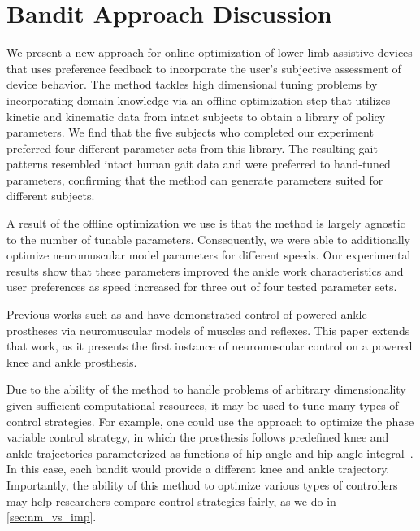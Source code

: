 \section{Bandit Approach Discussion}\label{sec:bandit_discussion}

We present a new approach for online optimization of lower limb assistive
devices that uses preference feedback to incorporate the user's subjective
assessment of device behavior. The method tackles high dimensional tuning
problems by incorporating domain knowledge via an offline optimization step that
utilizes kinetic and kinematic data from intact subjects to obtain a library of
policy parameters. We find that the five subjects who completed our experiment
preferred four different parameter sets from this library. The resulting gait
patterns resembled intact human gait data and were preferred to hand-tuned
parameters, confirming that the method can generate parameters suited for
different subjects.

A result of the offline optimization we use is that the method is largely
agnostic to the number of tunable parameters. Consequently, we were able to
additionally optimize neuromuscular model parameters for different speeds.  Our
experimental results show that these parameters improved the ankle work
characteristics and user preferences as speed increased for three out of four
tested parameter sets. 

Previous works such as \citet{eilenberg2010control} and
\citet{markowitz2011speed} have demonstrated control of powered ankle prostheses
via neuromuscular models of muscles and reflexes. This paper extends that work,
as it presents the first instance of neuromuscular control on a powered knee and
ankle prosthesis.

Due to the ability of the method to handle problems of arbitrary dimensionality
given sufficient computational resources, it may be used to tune many types of
control strategies. For example, one could use the approach to optimize the
phase variable control strategy, in which the prosthesis follows predefined knee
and ankle trajectories parameterized as functions of hip angle and hip angle
integral~\citep{quintero2016preliminary}. In this case, each bandit would
provide a different knee and ankle trajectory.  Importantly, the ability of this
method to optimize various types of controllers may help researchers compare
control strategies fairly, as we do in \cref{sec:nm_vs_imp}.

